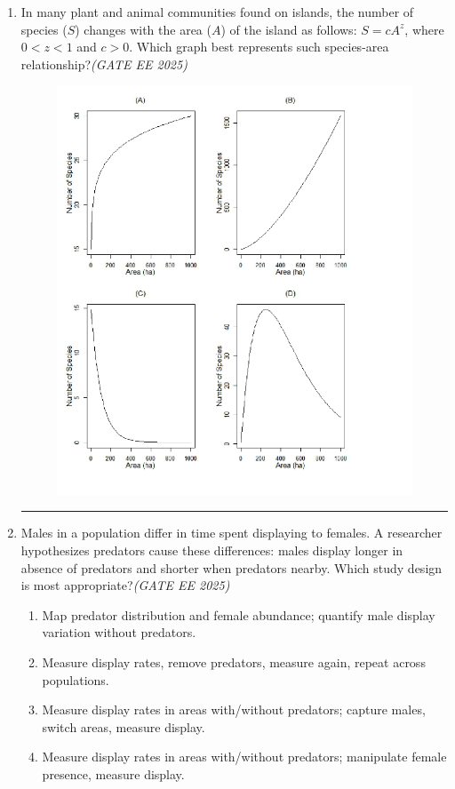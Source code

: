 \begin{enumerate}[leftmargin=*,label=\textbf{Q.\arabic*},resume]
\item In many plant and animal communities found on islands, the number of species ($S$) changes with the area ($A$) of the island as follows: $S = c A^z$, where $0 < z < 1$ and $c>0$. Which graph best represents such species-area relationship?\hfill \textit{(GATE EE 2025)}

\vspace{1em}
\begin{figure}[h!]
    \centering
    \includegraphics[width=0.9\linewidth]{figs/imageQ36.png}
\end{figure}
\vspace{1em}

\rule{7cm}{0.15mm} %

\item Males in a population differ in time spent displaying to females. A researcher hypothesizes predators cause these differences: males display longer in absence of predators and shorter when predators nearby. Which study design is most appropriate?\hfill \textit{(GATE EE 2025)}
\begin{multicols}{2}
\begin{enumerate}[label=(\Alph*)]
\item Map predator distribution and female abundance; quantify male display variation without predators.
\item Measure display rates, remove predators, measure again, repeat across populations.
\item Measure display rates in areas with/without predators; capture males, switch areas, measure display.
\item Measure display rates in areas with/without predators; manipulate female presence, measure display.
\end{enumerate}
\end{multicols}


\end{enumerate}
